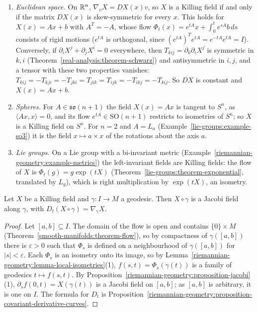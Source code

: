 \begin{example}\label{riemannian-geometry:example-killing-fields}
\begin{enumerate}
\item \emph{Euclidean space.} On $\mathbb{R}^n$, $\nabla_vX = DX(x)v$, so $X$ is a Killing field if and only if the matrix $DX(x)$ is skew-symmetric for every $x$. This holds for
$X(x) = Ax + b$ with $A^T = -A$, whose flow $\Phi_t(x) = e^{tA}x + \int_0^te^{sA}b\,ds$ consists of rigid motions ($e^{tA}$ is orthogonal, since
$(e^{tA})^Te^{tA} = e^{-tA}e^{tA} = I$). Conversely, if $\partial_iX^j + \partial_jX^i = 0$ everywhere, then $T_{kij} = \partial_k\partial_iX^j$ is symmetric in
$k, i$ (Theorem~\ref{real-analysis:theorem-schwarz}) and antisymmetric in $i, j$, and a tensor with these two properties vanishes:
$T_{kij} = -T_{kji} = -T_{jki} = T_{jik} = T_{ijk} = -T_{ikj} = -T_{kij}$. So $DX$ is constant and $X(x) = Ax + b$.
\item \emph{Spheres.} For $A \in \mathfrak{so}(n + 1)$ the field $X(x) = Ax$ is tangent to $S^n$, as $\langle Ax, x\rangle = 0$, and its flow $e^{tA} \in \mathrm{SO}(n + 1)$
restricts to isometries of $S^n$; so $X$ is a Killing field on $S^n$. For $n = 2$ and $A = L_a$ (Example~\ref{lie-groups:example-so3}) it is the field
$x \mapsto a \times x$ of the rotations about the axis $a$.
\item \emph{Lie groups.} On a Lie group with a bi-invariant metric (Example~\ref{riemannian-geometry:example-metrics}) the left-invariant fields are Killing fields: the
flow of $X$ is $\Phi_t(g) = g\exp(tX)$ (Theorem~\ref{lie-groups:theorem-exponential}, translated by $L_g$), which is right multiplication by $\exp(tX)$, an isometry.
\end{enumerate}
\end{example}

\begin{proposition}\label{riemannian-geometry:proposition-killing-jacobi}
Let $X$ be a Killing field and $\gamma \colon I \to M$ a geodesic. Then $X \circ \gamma$ is a Jacobi field along $\gamma$, with $D_t(X \circ \gamma) = \nabla_{\dot\gamma}X$.
\end{proposition}

\begin{proof}
Let $[a, b] \subseteq I$. The domain of the flow is open and contains $\{0\} \times M$ (Theorem~\ref{smooth-manifolds:theorem-flow}), so by compactness of
$\gamma([a, b])$ there is $\varepsilon > 0$ such that $\Phi_s$ is defined on a neighbourhood of $\gamma([a, b])$ for $|s| < \varepsilon$. Each $\Phi_s$ is an isometry onto
its image, so by Lemma~\ref{riemannian-geometry:lemma-local-isometries}(1), $f(s, t) = \Phi_s(\gamma(t))$ is a family of geodesics $t \mapsto f(s, t)$. By
Proposition~\ref{riemannian-geometry:proposition-jacobi}(1), $\partial_sf(0, t) = X(\gamma(t))$ is a Jacobi field on $[a, b]$; as $[a, b]$ is arbitrary, it is one on $I$.
The formula for $D_t$ is Proposition~\ref{riemannian-geometry:proposition-covariant-derivative-curves}.
\end{proof}

